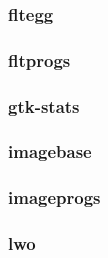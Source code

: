 \documentclass[a4paper]{article}
\begin{document}
\hypertarget{RefHeading22891167907073}{}\subsubsection{}
\clearpage\subsubsection[fltegg]{fltegg}
\hypertarget{RefHeading22911167907073}{}\subsubsection{}
\clearpage\subsubsection[fltprogs]{fltprogs}
\hypertarget{RefHeading22931167907073}{}\subsubsection{}
\clearpage\subsubsection[gtk{}-stats]{gtk-stats}
\hypertarget{RefHeading22951167907073}{}\subsubsection{}
\clearpage\subsubsection[imagebase]{imagebase}
\hypertarget{RefHeading22971167907073}{}\subsubsection{}
\clearpage\subsubsection[imageprogs]{imageprogs}
\hypertarget{RefHeading22991167907073}{}\subsubsection{}
\clearpage\subsubsection[lwo]{lwo}
\hypertarget{RefHeading23011167907073}{}\subsubsection{}
\end{document}
